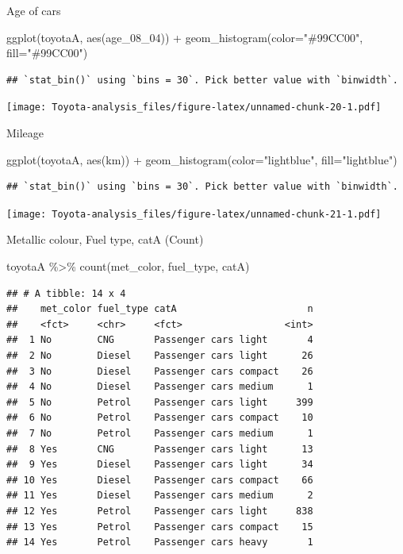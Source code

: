 \documentclass[
]{article}
\newenvironment{Shaded}{\begin{snugshade}}{\end{snugshade}}
\newcommand{\AttributeTok}[1]{\textcolor[rgb]{0.77,0.63,0.00}{#1}}
\newcommand{\FunctionTok}[1]{\textcolor[rgb]{0.00,0.00,0.00}{#1}}
\newcommand{\NormalTok}[1]{#1}
\newcommand{\SpecialCharTok}[1]{\textcolor[rgb]{0.00,0.00,0.00}{#1}}
\newcommand{\StringTok}[1]{\textcolor[rgb]{0.31,0.60,0.02}{#1}}
\begin{document}
Age of cars

\begin{Shaded}
\begin{Highlighting}[]
\FunctionTok{ggplot}\NormalTok{(toyotaA, }\FunctionTok{aes}\NormalTok{(age\_08\_04)) }\SpecialCharTok{+} \FunctionTok{geom\_histogram}\NormalTok{(}\AttributeTok{color=}\StringTok{"\#99CC00"}\NormalTok{, }\AttributeTok{fill=}\StringTok{"\#99CC00"}\NormalTok{)}
\end{Highlighting}
\end{Shaded}

\begin{verbatim}
## `stat_bin()` using `bins = 30`. Pick better value with `binwidth`.
\end{verbatim}

\texttt{[image: Toyota-analysis\_files/figure-latex/unnamed-chunk-20-1.pdf]}

Mileage

\begin{Shaded}
\begin{Highlighting}[]
\FunctionTok{ggplot}\NormalTok{(toyotaA, }\FunctionTok{aes}\NormalTok{(km)) }\SpecialCharTok{+} \FunctionTok{geom\_histogram}\NormalTok{(}\AttributeTok{color=}\StringTok{"lightblue"}\NormalTok{, }\AttributeTok{fill=}\StringTok{"lightblue"}\NormalTok{) }
\end{Highlighting}
\end{Shaded}

\begin{verbatim}
## `stat_bin()` using `bins = 30`. Pick better value with `binwidth`.
\end{verbatim}

\texttt{[image: Toyota-analysis\_files/figure-latex/unnamed-chunk-21-1.pdf]}

Metallic colour, Fuel type, catA (Count)

\begin{Shaded}
\begin{Highlighting}[]
\NormalTok{toyotaA }\SpecialCharTok{\%\textgreater{}\%} 
  \FunctionTok{count}\NormalTok{(met\_color, fuel\_type, catA)}
\end{Highlighting}
\end{Shaded}

\begin{verbatim}
## # A tibble: 14 x 4
##    met_color fuel_type catA                       n
##    <fct>     <chr>     <fct>                  <int>
##  1 No        CNG       Passenger cars light       4
##  2 No        Diesel    Passenger cars light      26
##  3 No        Diesel    Passenger cars compact    26
##  4 No        Diesel    Passenger cars medium      1
##  5 No        Petrol    Passenger cars light     399
##  6 No        Petrol    Passenger cars compact    10
##  7 No        Petrol    Passenger cars medium      1
##  8 Yes       CNG       Passenger cars light      13
##  9 Yes       Diesel    Passenger cars light      34
## 10 Yes       Diesel    Passenger cars compact    66
## 11 Yes       Diesel    Passenger cars medium      2
## 12 Yes       Petrol    Passenger cars light     838
## 13 Yes       Petrol    Passenger cars compact    15
## 14 Yes       Petrol    Passenger cars heavy       1
\end{verbatim}
\end{document}
